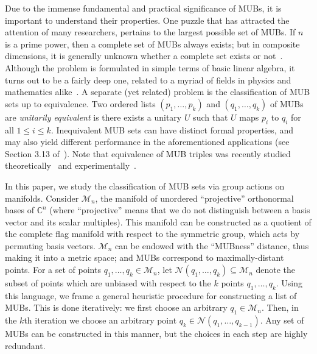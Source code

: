 \documentclass[referee,sn-mathphys-num]{sn-jnl}%
\theoremstyle{thmstyleone}%
\theoremstyle{thmstyletwo}%
\theoremstyle{remark}
\theoremstyle{thmstylethree}%
\begin{document}
Due to the immense fundamental and practical significance of MUBs, it is important to understand their properties. One puzzle that has attracted the attention of many researchers, pertains to the largest possible set of MUBs.
If $n$ is a prime power, then a complete set of MUBs always exists; but in composite dimensions, it is generally unknown whether a complete set exists or not~\cite{brierley2009constructing,weiner2013gap,horodecki2022five,mcnulty2024mutually}. Although the problem is formulated in simple terms of basic linear algebra, it turns out to be a fairly deep one, related to a myriad of fields in physics and mathematics alike~\cite{planat2006survey,bengtsson2007three,bengtsson2007mutually,Boykin2007Mutually,brierley2009mutually,brierley2009all,godsil2009equiangular,durt2010mutually}.
A separate (yet related) problem is the classification of MUB sets up to equivalence. Two ordered lists $ \left( p_1, \ldots, p_k \right) $ and $ \left( q_1, \ldots, q_k \right) $ of MUBs are \textit{unitarily equivalent} is there exists a unitary $U$ such that $ U $ maps $p_i$ to $q_i$ for all $1 \leq i \leq k$. Inequivalent MUB sets can have distinct formal properties, and may also yield different performance in the aforementioned applications (see Section 3.13 of~\cite{mcnulty2024mutually}). Note that equivalence of MUB triples was recently studied theoretically~\cite{matolcsi2025triplets} and experimentally~\cite{PhysRevLett.132.080202}.

In this paper, we study the classification of MUB sets via group actions on manifolds.
Consider $ \mathcal{M}_n $, the manifold of unordered ``projective'' orthonormal bases of $ \mathbb{C}^n $ (where ``projective'' means that we do not distinguish between a basis vector and its scalar multiples). This manifold can be constructed as a quotient of the complete flag manifold with respect to the symmetric group, which acts by permuting basis vectors. $ \mathcal{M}_n $ can be endowed with the ``MUBness'' distance, thus making it into a metric space; and MUBs correspond to maximally-distant points. For a set of points $q_1, \ldots, q_k \in \mathcal{M}_n $, let $ \mathcal{N} \left( q_1, \ldots, q_k \right) \subseteq \mathcal{M}_n $ denote the subset of points which are unbiased with respect to the $k $ points $ q_1, \ldots, q_k $.
Using this language, we frame a general heuristic procedure for constructing a list of MUBs. This is done iteratively: we first choose an arbitrary $ q_1 \in \mathcal{M}_n $. Then, in the $k$th iteration we choose an arbitrary point $q_k \in \mathcal{N} \left( q_1, \ldots, q_{k-1} \right) $. Any set of MUBs can be constructed in this manner, but the choices in each step are highly redundant. 
\end{document}
